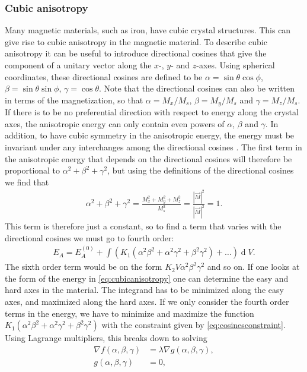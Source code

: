 \documentclass[12pt, a4paper, twoside, openright]{article}		%
\renewcommand{\d}[1]{\ensuremath{\operatorname{d}\!{#1}}}
\numberwithin{equation}{section}
\begin{document}
\subsubsection{Cubic anisotropy}
Many magnetic materials, such as iron, have cubic crystal structures. This can give rise to cubic anisotropy in the magnetic material. To describe cubic anisotropy it can be useful to introduce directional cosines that give the component of a unitary vector along the $x$-, $y$- and $z$-axes. Using spherical coordinates, these directional cosines are defined to be $\alpha = \sin\theta\cos\phi$, $\beta = \sin\theta\sin\phi$, $\gamma = \cos\theta$. Note that the directional cosines can also be written in terms of the magnetization, so that $\alpha = M_x/M_s$, $\beta = M_y/M_s$ and $\gamma = M_z/M_s$. If there is to be no preferential direction with respect to energy along the crystal axes, the anisotropic energy can only contain even powers of $\alpha$, $\beta$ and $\gamma$. In addition, to have cubic symmetry in the anisotropic energy, the energy must be invariant under any interchanges among the directional cosines \cite{Kittel:ISSP}. The first term in the anisotropic energy that depends on the directional cosines will therefore be proportional to $\alpha^2+\beta^2+\gamma^2$, but using the definitions of the directional cosines we find that
\begin{align}
\label{eq:cosinesconstraint}
\alpha^2+\beta^2+\gamma^2 = \frac{M_x^2+M_y^2+M_z^2}{M_s^2} = \frac{|\vec{M}|^2}{|\vec{M}|^2} = 1.
\end{align}
This term is therefore just a constant, so to find a term that varies with the directional cosines we must go to fourth order:
\begin{align}
\label{eq:cubicanisotropy}
E_A = E_A^{(0)} + \int (K_1 (\alpha^2\beta^2+\alpha^2\gamma^2+\beta^2\gamma^2) + \ldots ) \d V.
\end{align}
The sixth order term would be on the form $K_2 V \alpha^2\beta^2\gamma^2$ and so on. If one looks at the form of the energy in \eqref{eq:cubicanisotropy} one can determine the easy and hard axes in the material. The integrand has to be minimized along the easy axes, and maximized along the hard axes. If we only consider the fourth order terms in the energy, we have to minimize and maximize the function $K_1 (\alpha^2\beta^2+\alpha^2\gamma^2+\beta^2\gamma^2)$ with the constraint given by \eqref{eq:cosinesconstraint}. Using Lagrange multipliers, this breaks down to solving 
\begin{align}
\nabla f(\alpha, \beta, \gamma) &= \lambda \nabla g(\alpha, \beta, \gamma), \\
g(\alpha, \beta, \gamma) &= 0,
\end{align}
\end{document}
